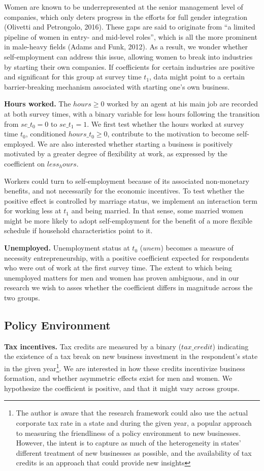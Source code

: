 Women are known to be underrepresented at the senior management level of companies, which only deters progress in the efforts for full gender integration (Olivetti and Petrongolo, 2016). These gaps are said to originate from “a limited pipeline of women in entry- and mid-level roles”, which is all the more prominent in male-heavy fields (Adams and Funk, 2012). As a result, we wonder whether self-employment can address this issue, allowing women to break into industries by starting their own companies. If coefficients for certain industries are positive and significant for this group at survey time $t_1$, data might point to a certain barrier-breaking mechanism associated with starting one's own business. 


\textbf{Hours worked.} The $hours \geq 0$ worked by an agent at his main job are recorded at both survey times, with a binary variable for less hours following the transition from $se\_t_0 = 0$ to $se\_t_1 = 1$. We first test whether the hours worked at survey time $t_0$, conditioned $hours\_t_0 \geq 0$, contribute to the motivation to become self-employed. We are also interested whether starting a business is positively motivated by a greater degree of flexibility at work, as expressed by the coefficient on $less_hours$. 

Workers could turn to self-employment because of its associated non-monetary benefits, and not necessarily for the economic incentives. To test whether the positive effect is controlled by marriage status, we implement an interaction term for working less at $t_1$ and being married. In that sense, some married women might be more likely to adopt self-employment for the benefit of a more flexible schedule if household characteristics point to it. 

\textbf{Unemployed.} Unemployment status at $t_0$ ($unem$) becomes a measure of necessity entrepreneurship, with a positive coefficient expected for respondents who were out of work at the first survey time. The extent to which being unemployed matters for men and women has proven ambiguous, and in our research we wish to asses whether the coefficient differs in magnitude across the two groups.


\subsection{Policy Environment}

\textbf{Tax incentives.} Tax credits are measured by a binary ($tax\_credit$) indicating the existence of a tax break on new business investment in the respondent's state in the given year\footnote{The author is aware that the research framework could also use the actual corporate tax rate in a state and during the given year, a popular approach to measuring the friendliness of a policy environment to new businesses. However, the intent is to capture as much of the heterogeneity in states' different treatment of new businesses as possible, and the availability of tax credits is an approach that could provide new insights}. We are interested in how these credits incentivize business formation, and whether asymmetric effects exist for men and women. We hypothesize the coefficient is positive, and that it might vary across groups.

